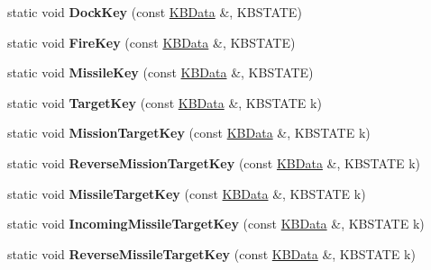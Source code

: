 \begin{DoxyCompactItemize}
\item 
static void {\bfseries Dock\+Key} (const \hyperlink{classKBData}{K\+B\+Data} \&, K\+B\+S\+T\+A\+TE)\hypertarget{classFireKeyboard_af292ea28016a5e1606c53fed484cd09f}{}\label{classFireKeyboard_af292ea28016a5e1606c53fed484cd09f}

\item 
static void {\bfseries Fire\+Key} (const \hyperlink{classKBData}{K\+B\+Data} \&, K\+B\+S\+T\+A\+TE)\hypertarget{classFireKeyboard_ab62eba427e628f6837bf433f7d63de63}{}\label{classFireKeyboard_ab62eba427e628f6837bf433f7d63de63}

\item 
static void {\bfseries Missile\+Key} (const \hyperlink{classKBData}{K\+B\+Data} \&, K\+B\+S\+T\+A\+TE)\hypertarget{classFireKeyboard_ac8823c6aabba6885dec2ead7476e64e1}{}\label{classFireKeyboard_ac8823c6aabba6885dec2ead7476e64e1}

\item 
static void {\bfseries Target\+Key} (const \hyperlink{classKBData}{K\+B\+Data} \&, K\+B\+S\+T\+A\+TE k)\hypertarget{classFireKeyboard_a7b22f08e14659c61d85ff876379d22f6}{}\label{classFireKeyboard_a7b22f08e14659c61d85ff876379d22f6}

\item 
static void {\bfseries Mission\+Target\+Key} (const \hyperlink{classKBData}{K\+B\+Data} \&, K\+B\+S\+T\+A\+TE k)\hypertarget{classFireKeyboard_a185b5d65f6104f30a07357443cdccd14}{}\label{classFireKeyboard_a185b5d65f6104f30a07357443cdccd14}

\item 
static void {\bfseries Reverse\+Mission\+Target\+Key} (const \hyperlink{classKBData}{K\+B\+Data} \&, K\+B\+S\+T\+A\+TE k)\hypertarget{classFireKeyboard_ac659327566c1b686ae1543ea70d2d2bf}{}\label{classFireKeyboard_ac659327566c1b686ae1543ea70d2d2bf}

\item 
static void {\bfseries Missile\+Target\+Key} (const \hyperlink{classKBData}{K\+B\+Data} \&, K\+B\+S\+T\+A\+TE k)\hypertarget{classFireKeyboard_a4bb75d2e412be4941fbd9ae86dc644ac}{}\label{classFireKeyboard_a4bb75d2e412be4941fbd9ae86dc644ac}

\item 
static void {\bfseries Incoming\+Missile\+Target\+Key} (const \hyperlink{classKBData}{K\+B\+Data} \&, K\+B\+S\+T\+A\+TE k)\hypertarget{classFireKeyboard_a346c2d51e3a0a21ca820e29954b9fc3d}{}\label{classFireKeyboard_a346c2d51e3a0a21ca820e29954b9fc3d}

\item 
static void {\bfseries Reverse\+Missile\+Target\+Key} (const \hyperlink{classKBData}{K\+B\+Data} \&, K\+B\+S\+T\+A\+TE k)\hypertarget{classFireKeyboard_a2cf077a2fbceedac314ee89633344bef}{}\label{classFireKeyboard_a2cf077a2fbceedac314ee89633344bef}


\end{DoxyCompactItemize}
